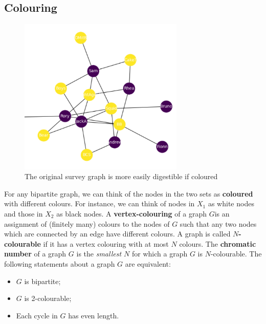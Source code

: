 \documentclass[a4paper,11pt]{article}
\begin{document}
\subsection{Colouring}
\begin{figure}[H]
    \centering
    \includegraphics[width=0.7\textwidth]{./images/colouredsurvey.png}
    \caption{ The original survey graph is more easily digestible if coloured }
\end{figure}

For any bipartite graph, we can think of the nodes in the two sets as \textbf{coloured} with different colours.
For instance, we can think of nodes in $X_1$ as white nodes and those in $X_2$ as black nodes.
A \textbf{vertex-colouring} of a graph $G$is an assignment of (finitely many) colours to the nodes of $G$ such that any two nodes which are connected by an edge have different colours.
A graph is called \textbf{$N$-colourable} if it has a vertex colouring with at most $N$ colours.
The \textbf{chromatic number} of a graph $G$ is the \textit{smallest $N$} for which a graph $G$ is $N$-colourable.
The following statements about a graph $G$ are equivalent:
\begin{itemize}
    \item   $G$ is bipartite;
    \item   $G$ is 2-colourable;
    \item   Each cycle in $G$ has even length.
\end{itemize}
\end{document}
